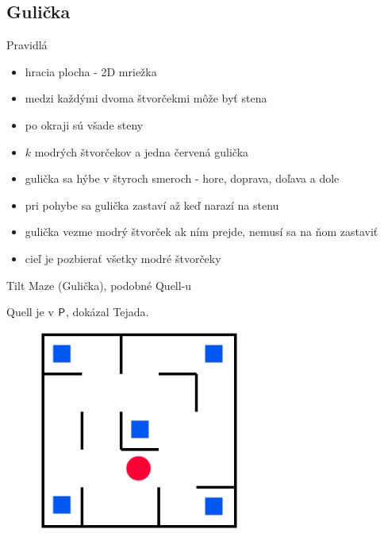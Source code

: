 \documentclass[xcolor={table}]{beamer}
\begin{document}
		\subsection{Gulička}
			\begin{frame}{Pravidlá}
				\begin{block}{}
					\begin{itemize}
					    \item hracia plocha - 2D mriežka
					    \item medzi každými dvoma štvorčekmi môže byť stena
					    \item po okraji sú všade steny
					    \item $k$ modrých štvorčekov a jedna červená gulička
					    \item gulička sa hýbe v štyroch smeroch - hore, doprava, doľava a dole
					    \item pri pohybe sa gulička zastaví až keď narazí na stenu
					    \item gulička vezme modrý štvorček ak ním prejde, nemusí sa na ňom zastaviť
					    \item cieľ je pozbierať všetky modré štvorčeky
					\end{itemize}
				\end{block}
			\end{frame}
			\begin{frame}{}
				\begin{block}{}
					Tilt Maze (Gulička), podobné Quell-u
					
					Quell je v $\P$, dokázal Tejada\cite{tejada2014complexity}.
				\end{block}
			\end{frame}
			\begin{frame}{}
				\begin{figure}[h]
				    \centering
				    \includegraphics[width=0.6\textwidth]{images/gulicka}
				\end{figure}
			\end{frame}
\end{document}

